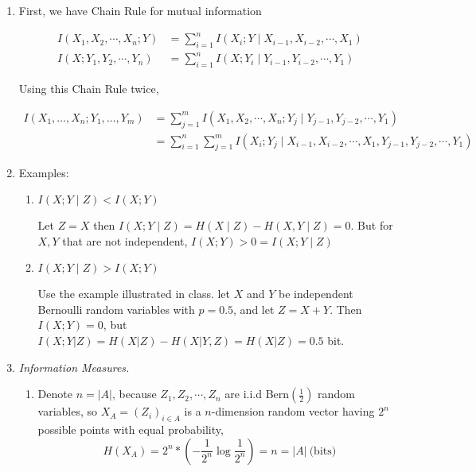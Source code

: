 \documentclass[a4paper]{article}
\begin{document}
\begin{enumerate}
  \setlength{\itemsep}{3\parskip}

  \item First, we have Chain Rule for mutual information 
  
  \begin{equation}
    \begin{aligned}
      I\left(X_{1}, X_{2}, \cdots, X_{n} ; Y\right)&=\sum_{i=1}^{n} I\left(X_{i} ; Y \mid X_{i-1}, X_{i-2}, \cdots, X_{1}\right) \\
      I\left(X ; Y_1,Y_2,\cdots,Y_n \right)&=\sum_{i=1}^{n} I\left(X ; Y_i \mid Y_{i-1}, Y_{i-2}, \cdots, Y_{1}\right) 
    \end{aligned}
  \end{equation}

  Using this Chain Rule twice,

  \begin{equation}
    \begin{aligned}
      I\left(X_{1}, \ldots, X_{n} ; Y_{1}, \ldots, Y_{m}\right) & = \sum_{j=1}^m I\left(X_{1}, X_{2}, \cdots, X_{n} ; Y_j \mid Y_{j-1}, Y_{j-2}, \cdots, Y_{1}\right)  \\ 
      & = \sum_{i=1}^n \sum_{j=1}^m I\left(X_{i} ; Y_j \mid X_{i-1}, X_{i-2}, \cdots, X_{1},Y_{j-1}, Y_{j-2}, \cdots, Y_{1}\right)
    \end{aligned}
  \end{equation}


  \item Examples:
  \begin{enumerate}
    \item $I(X ; Y \mid Z)<I(X ; Y)$
    
        Let $Z=X$ then $I(X;Y\mid Z) = H(X\mid Z) - H(X,Y\mid Z) = 0$. But for $X,Y$ that are not independent, $I(X;Y)>0 = I(X ; Y \mid Z)$

    \item $I(X ; Y \mid Z)>I(X ; Y) $
    
      Use the example illustrated in class. let $X$ and $Y$ be independent Bernoulli random variables with $p=0.5 $, and let $Z = X+Y$. Then $I (X ; Y) = 0$, but $I (X ; Y | Z) = H(X | Z) - H(X | Y, Z) = H(X | Z) =  0.5$ bit.

  \end{enumerate}

  \item \textit{Information Measures.}
    \begin{enumerate}
      \item Denote $n=|A|$, because $Z_1,Z_2,\cdots,Z_n$ are i.i.d Bern$(\frac 1 2)$ random variables, so $X_A = (Z_i)_{i\in A}$ is a $n$-dimension random vector having $2^n$ possible points with equal probability, 
      \begin{equation}
        H(X_A) = 2^n *(-\frac 1 {2^n} \log \frac 1 {2^n}) = n = |A| ~\text{(bits)}
      \end{equation} 



\end{enumerate}
\end{enumerate}
\end{document}
